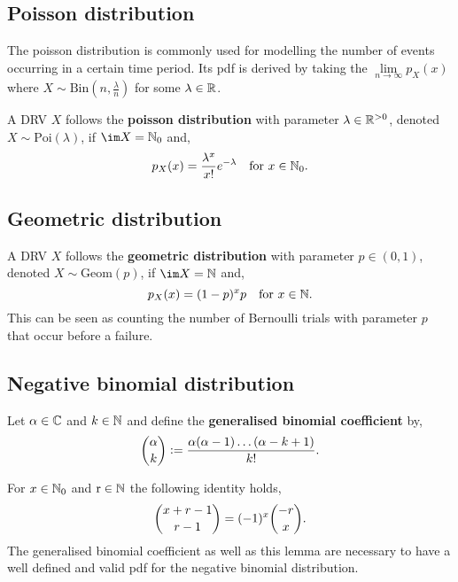 \documentclass[../Year1/Year1.tex]{subfiles}
\begin{document}
\subsection{Poisson distribution}
The poisson distribution is commonly used for modelling the number of events occurring in a certain time period. Its pdf is derived by taking the $\lim\limits_{n\rightarrow\infty}p_X(x)$ where $X \sim \text{Bin}(n,\frac{\lambda}{n})$ for some $\lambda \in \mathbb{R}$.

\begingroup\belowdisplayskip=-10pt
\begin{definition}
    A DRV $X$ follows the \textbf{poisson distribution} with parameter $\lambda\in\mathbb{R}^{>0}$, denoted $X \sim \text{Poi}(\lambda)$, if $\im X = \NN_0$ and, \[
        p_X(x) = \frac{\lambda^x}{x!}e^{-\lambda} \quad \text{\textcolor{black}{for }$x\in\mathbb{N}_0$}\textcolor{black}{.}
    \]
\end{definition}
\endgroup

\subsection{Geometric distribution}
\begin{definition}
    A DRV $X$ follows the \textbf{geometric distribution} with parameter $p \in (0,1)$, denoted $X \sim \text{Geom}(p)$, if $\im X = \NN$ and, \[
        p_X(x) = (1-p)^xp \quad \text{\textcolor{black}{for }$x\in\mathbb{N}$}\textcolor{black}{.}
    \]
This can be seen as counting the number of Bernoulli trials with parameter $p$ that occur before a failure.
\end{definition}

\subsection{Negative binomial distribution}
\begingroup\belowdisplayskip=-20pt
\begin{definition}
    Let $\alpha\in\mathbb{C}$ and $k\in\mathbb{N}$ and define the \textbf{generalised binomial coefficient} by,\[
    \binom{\alpha}{k} := \frac{\alpha(\alpha-1)\ldots(\alpha-k+1)}{k!}\textcolor{black}{.}
    \]
\end{definition}
\endgroup

\begin{lemma}
    For $x\in\mathbb{N}_0$ and $\mathrm{r}\in\mathbb{N}$ the following identity holds,
    \[
    \binom{x+r-1}{r-1} = (-1)^x\binom{-r}{x}\textcolor{black}{.}
    \]
The generalised binomial coefficient as well as this lemma are necessary to have a well defined and valid pdf for the negative binomial distribution.
\end{lemma}
\end{document}
